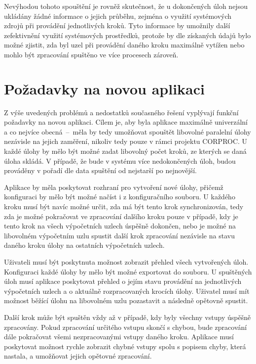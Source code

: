 Nevýhodou tohoto spouštění je rovněž skutečnost, že u dokončených úloh nejsou ukládány žádné informace o jejich průběhu, zejména o využití systémových zdrojů při provádění jednotlivých kroků. Tyto informace by umožnily další zefektivnění využití systémových prostředků, protože by dle získaných údajů bylo možné zjistit, zda byl uzel při provádění daného kroku maximálně vytížen nebo mohlo být zpracování spuštěno ve více procesech zároveň.

\section{Požadavky na novou aplikaci}

 Z výše uvedených problémů a nedostatků současného řešení vyplývají funkční požadavky na novou aplikaci. Cílem je, aby byla aplikace maximálně univerzální a co nejvíce obecná~--~měla by tedy umožňovat spouštět libovolné paralelní úlohy nezávisle na jejich zaměření, nikoliv tedy pouze v rámci projektu CORPROC. U každé úlohy by mělo být možné zadat libovolný počet kroků, ze kterých se daná úloha skládá. V případě, že bude v systému více nedokončených úloh, budou prováděny v pořadí dle data spuštění od nejstarší po nejnovější.
 
 Aplikace by měla poskytovat rozhraní pro vytvoření nové úlohy, přičemž konfiguraci by mělo být možné načíst i z konfiguračního souboru. U každého kroku musí být navíc možné určit, zda má být tento krok synchronizován, tedy zda je možné pokračovat ve zpracování dalšího kroku pouze v případě, kdy je tento krok na všech výpočetních uzlech úspěšně dokončen, nebo je možné na libovolném výpočetním uzlu spustit další krok zpracování nezávisle na stavu daného kroku úlohy na ostatních výpočetních uzlech.
 
Uživateli musí být poskytnuta možnost zobrazit přehled všech vytvořených úloh. Konfiguraci každé úlohy by mělo být možné exportovat do souboru. U spuštěných úloh musí aplikace poskytovat přehled o jejím stavu provádění na jednotlivých výpočetních uzlech a o aktuálně rozpracovaných krocích úlohy. Uživatel musí mít možnost běžící úlohu na libovolném uzlu pozastavit a následně opětovně spustit.

Další krok může být spuštěn vždy až v případě, kdy byly všechny vstupy úspěšně zpracovány. Pokud zpracování určitého vstupu skončí s chybou, bude zpracování dále pokračovat všemi nezpracovanými vstupy daného kroku. Aplikace musí poskytovat možnost rychle zobrazit chybné vstupy spolu s popisem chyby, která nastala, a umožňovat jejich opětovné zpracování. 

